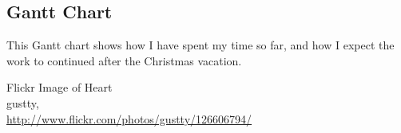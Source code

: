 \documentclass[12pt]{report}
\begin{document}
\pagebreak

\begin{landscape}

\section{Gantt Chart}
This Gantt chart shows how I have spent my time so far, and how I expect the
work to continued after the Christmas vacation.
\end{landscape}

\pagebreak


\begin{thebibliography}{9}


	Flickr Image of Heart \\
	gustty,\\
	\url{http://www.flickr.com/photos/gustty/126606794/}


\end{thebibliography}
\end{document}
